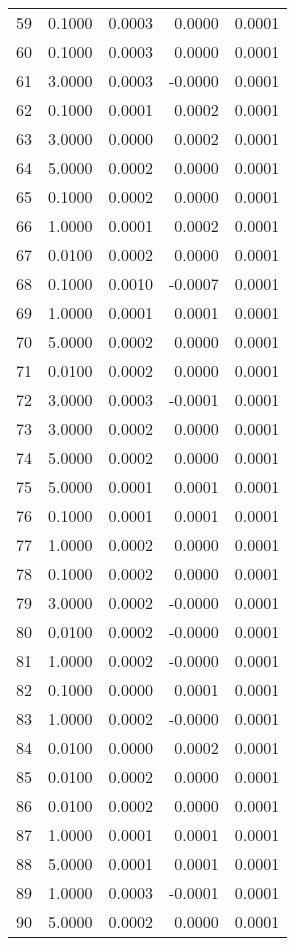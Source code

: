 \begin{longtable}{lrrrr}
59 & 0.1000 & 0.0003 & 0.0000 & 0.0001 \\
60 & 0.1000 & 0.0003 & 0.0000 & 0.0001 \\
61 & 3.0000 & 0.0003 & -0.0000 & 0.0001 \\
62 & 0.1000 & 0.0001 & 0.0002 & 0.0001 \\
63 & 3.0000 & 0.0000 & 0.0002 & 0.0001 \\
64 & 5.0000 & 0.0002 & 0.0000 & 0.0001 \\
65 & 0.1000 & 0.0002 & 0.0000 & 0.0001 \\
66 & 1.0000 & 0.0001 & 0.0002 & 0.0001 \\
67 & 0.0100 & 0.0002 & 0.0000 & 0.0001 \\
68 & 0.1000 & 0.0010 & -0.0007 & 0.0001 \\
69 & 1.0000 & 0.0001 & 0.0001 & 0.0001 \\
70 & 5.0000 & 0.0002 & 0.0000 & 0.0001 \\
71 & 0.0100 & 0.0002 & 0.0000 & 0.0001 \\
72 & 3.0000 & 0.0003 & -0.0001 & 0.0001 \\
73 & 3.0000 & 0.0002 & 0.0000 & 0.0001 \\
74 & 5.0000 & 0.0002 & 0.0000 & 0.0001 \\
75 & 5.0000 & 0.0001 & 0.0001 & 0.0001 \\
76 & 0.1000 & 0.0001 & 0.0001 & 0.0001 \\
77 & 1.0000 & 0.0002 & 0.0000 & 0.0001 \\
78 & 0.1000 & 0.0002 & 0.0000 & 0.0001 \\
79 & 3.0000 & 0.0002 & -0.0000 & 0.0001 \\
80 & 0.0100 & 0.0002 & -0.0000 & 0.0001 \\
81 & 1.0000 & 0.0002 & -0.0000 & 0.0001 \\
82 & 0.1000 & 0.0000 & 0.0001 & 0.0001 \\
83 & 1.0000 & 0.0002 & -0.0000 & 0.0001 \\
84 & 0.0100 & 0.0000 & 0.0002 & 0.0001 \\
85 & 0.0100 & 0.0002 & 0.0000 & 0.0001 \\
86 & 0.0100 & 0.0002 & 0.0000 & 0.0001 \\
87 & 1.0000 & 0.0001 & 0.0001 & 0.0001 \\
88 & 5.0000 & 0.0001 & 0.0001 & 0.0001 \\
89 & 1.0000 & 0.0003 & -0.0001 & 0.0001 \\
90 & 5.0000 & 0.0002 & 0.0000 & 0.0001 \\

\end{longtable}
